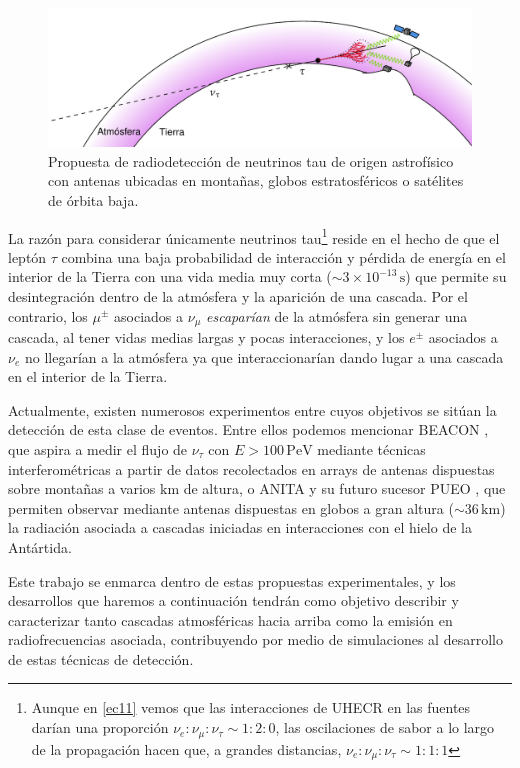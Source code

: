 \documentclass[11 pt, a4paper]{article} %
\numberwithin{equation}{section}
\numberwithin{figure}{section}
\numberwithin{table}{section}
\begin{document}
	\begin{figure}[H]
		\centering
		\includegraphics[width=.85\linewidth]{figures/shower_up_v2}
		\caption{Propuesta de radiodetección de neutrinos tau de origen astrofísico con antenas ubicadas en montañas, globos estratosféricos o satélites de órbita baja.}
		\label{shower_up}
	\end{figure}
La razón para considerar únicamente neutrinos tau\footnote{ Aunque en \eqref{ec11} vemos que las interacciones de UHECR en las fuentes darían una proporción $\nu_e:\nu_\mu:\nu_\tau\sim1:2:0$, las oscilaciones de sabor a lo largo de la propagación hacen que, a grandes distancias, $\nu_e:\nu_\mu:\nu_\tau\sim1:1:1$} reside en el hecho de que el leptón $\tau$ combina una baja probabilidad de interacción y pérdida de energía en el interior de la Tierra con una vida media muy corta ($\sim 3\times10^{-13}\,\mathrm{s}$) que permite su desintegración dentro de la atmósfera y la aparición de una cascada. Por el contrario, los $\mu^\pm$ asociados a $\nu_\mu$ \textit{escaparían} de la atmósfera sin generar una cascada, al tener vidas medias largas y pocas interacciones, y los $e^\pm$ asociados a $\nu_e$ no llegarían a la atmósfera ya que interaccionarían dando lugar a una cascada en el interior de la Tierra.

Actualmente, existen numerosos experimentos entre cuyos objetivos se sitúan la detección de esta clase de eventos. Entre ellos podemos mencionar BEACON \cite{southall2022design, wissel2021concept}, que aspira a medir el flujo de $\nu_\tau$ con $E>100\,\mathrm{PeV}$ mediante técnicas interferométricas a partir de datos recolectados en arrays de antenas dispuestas sobre montañas a varios $\mathrm{km}$ de altura, o ANITA y su futuro sucesor PUEO \cite{abarr2021payload}, que permiten observar mediante antenas dispuestas en globos a gran altura ($\sim 36\,\mathrm{km}$) la radiación asociada a cascadas iniciadas en interacciones con el hielo de la Antártida.

Este trabajo se enmarca dentro de estas propuestas experimentales, y los desarrollos que haremos a continuación tendrán como objetivo describir y caracterizar tanto cascadas atmosféricas hacia arriba como la emisión en radiofrecuencias asociada, contribuyendo por medio de simulaciones al desarrollo de estas técnicas de detección.
\clearpage
\end{document}
